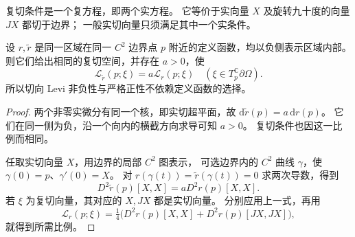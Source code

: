 复切条件是一个复方程，即两个实方程。
它等价于实向量 \(X\) 及旋转九十度的向量 \(JX\) 都切于边界；
一般实切向量只须满足其中一个实条件。

\begin{proposition}[定义函数的独立性]\label{b3:prop:29-levi-defining-independent}
设 \(r,\widetilde r\) 是同一区域在同一 \(C^2\) 边界点 \(p\)
附近的定义函数，均以负侧表示区域内部。
则它们给出相同的复切空间，并存在 \(a>0\)，使
\[
 \mathcal L_{\widetilde r}(p;\xi)=a\mathcal L_r(p;\xi)
 \quad(\xi\in T_p^{\mathbb C}\partial\Omega).
\]
所以切向 Levi 非负性与严格正性不依赖定义函数的选择。
\end{proposition}
\begin{proof}
两个非零实微分有同一个核，即实切超平面，故
\(\mathrm d\widetilde r(p)=a\,\mathrm dr(p)\)。
它们在同一侧为负，沿一个向内的横截方向求导可知 \(a>0\)。
复切条件也因这一比例而相同。

任取实切向量 \(X\)，用边界的局部 \(C^2\) 图表示，
可选边界内的 \(C^2\) 曲线 \(\gamma\)，使 \(\gamma(0)=p\)、\(\gamma'(0)=X\)。
对 \(r(\gamma(t))=\widetilde r(\gamma(t))=0\) 求两次导数，得到
\[
 D^2\widetilde r(p)[X,X]=aD^2r(p)[X,X].
\]
若 \(\xi\) 为复切向量，其对应的 \(X,JX\) 都是实切向量。
分别应用上一式，再用
\[
 \mathcal L_r(p;\xi)
 =\tfrac14\bigl(D^2r(p)[X,X]+D^2r(p)[JX,JX]\bigr),
\]
就得到所需比例。
\end{proof}

